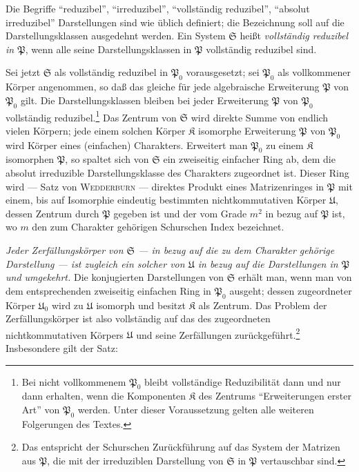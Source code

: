 \documentclass[12pt,a4paper]{article}
\newcommand{\PP}{\mathfrak{P}}          %
\theoremstyle{definition}
\begin{document}
Die Begriffe ``reduzibel'', ``irreduzibel'', ``vollst\"andig reduzibel'',
``absolut irreduzibel'' Darstellungen sind wie \"ublich definiert; die
Bezeichnung soll auf die Darstellungsklassen ausgedehnt werden. Ein System
$\mathfrak{S}$ hei\ss t \textit{vollst\"andig reduzibel in $\PP$}, wenn alle seine
Darstellungsklassen in $\PP$ vollst\"andig reduzibel sind.

Sei jetzt $\mathfrak{S}$ als vollst\"andig reduzibel in $\PP_0$ vorausgesetzt;
sei $\PP_0$ als vollkommener K\"orper angenommen, so da\ss{} das gleiche f\"ur
jede algebraische Erweiterung $\PP$ von $\PP_0$ gilt. Die
Darstellungsklassen bleiben bei jeder Erweiterung $\PP$ von $\PP_0$
vollst\"andig reduzibel.\footnote{Bei nicht vollkommenem $\PP_0$ bleibt
vollst\"andige Reduzibilit\"at dann und nur dann erhalten, wenn die
Komponenten $\mathfrak{K}$ des Zentrums ``Erweiterungen erster Art'' von
$\PP_0$ werden. Unter dieser Voraussetzung gelten alle weiteren
Folgerungen des Textes.} Das Zentrum von $\mathfrak{S}$ wird direkte
Summe von endlich vielen K\"orpern; jede einem solchen K\"orper
$\mathfrak{K}$ isomorphe Erweiterung $\PP$ von $\PP_0$ wird K\"orper eines
(einfachen) Charakters. Erweitert man $\PP_0$ zu einem $\mathfrak{K}$
isomorphen $\PP$, so spaltet sich von $\mathfrak{S}$ ein zweiseitig einfacher
Ring ab, dem die absolut irreduzible Darstellungsklasse des Charakters
zugeordnet ist. Dieser Ring wird --- Satz von \textsc{Wedderburn} ---
direktes Produkt eines Matrizenringes in $\PP$ mit einem, bis auf
Isomorphie eindeutig bestimmten nichtkommutativen K\"orper $\mathfrak{U}$,
dessen Zentrum durch $\PP$ gegeben ist und der vom Grade $m^2$ in bezug
auf $\PP$ ist, wo $m$ den zum Charakter geh\"origen Schurschen Index
bezeichnet.

\textit{Jeder Zerf\"allungsk\"orper von $\mathfrak{S}$ --- in bezug auf die zu
dem Charakter geh\"orige Darstellung --- ist zugleich ein solcher von
$\mathfrak{U}$ in bezug auf die Darstellungen in $\PP$ und umgekehrt.}
Die konjugierten Darstellungen von $\mathfrak{S}$ erh\"alt man, wenn man von
dem entsprechenden zweiseitig einfachen Ring in $\PP_0$ ausgeht; dessen
zugeordneter K\"orper $\mathfrak{U}_0$ wird zu $\mathfrak{U}$ isomorph und
besitzt $\mathfrak{K}$ als Zentrum. Das Problem der Zerf\"allungsk\"orper
ist also vollst\"andig auf das des zugeordneten nichtkommutativen K\"orpers
$\mathfrak{U}$ und seine Zerf\"allungen zur\"uckgef\"uhrt.\footnote{Das
entspricht der Schurschen Zur\"uckf\"uhrung auf das System der Matrizen
aus $\PP$, die mit der irreduziblen Darstellung von $\mathfrak{S}$ in $\PP$
vertauschbar sind.} Insbesondere gilt der Satz:
\end{document}

